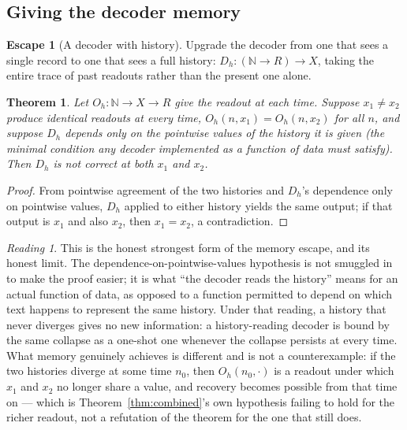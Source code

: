 \documentclass[10pt,twocolumn]{article}
\theoremstyle{plain}
\newtheorem{theorem}{Theorem}
\theoremstyle{definition}
\newtheorem{escape}{Escape}
\theoremstyle{remark}
\newtheorem*{reading}{Reading}
\begin{document}
\subsection{Giving the decoder memory}

\begin{escape}[A decoder with history]
Upgrade the decoder from one that sees a single record to one that sees a full history: $D_h : (\mathbb{N} \to R) \to X$, taking the entire trace of past readouts rather than the present one alone.
\end{escape}

\begin{theorem}\label{thm:escape4}
Let $O_h : \mathbb{N} \to X \to R$ give the readout at each time. Suppose $x_1 \neq x_2$ produce identical readouts at every time, $O_h(n,x_1) = O_h(n,x_2)$ for all $n$, and suppose $D_h$ depends only on the pointwise values of the history it is given (the minimal condition any decoder implemented as a function of data must satisfy). Then $D_h$ is not correct at both $x_1$ and $x_2$.
\end{theorem}

\begin{proof}
From pointwise agreement of the two histories and $D_h$'s dependence only on pointwise values, $D_h$ applied to either history yields the same output; if that output is $x_1$ and also $x_2$, then $x_1 = x_2$, a contradiction.
\end{proof}

\begin{reading}
This is the honest strongest form of the memory escape, and its honest limit. The dependence-on-pointwise-values hypothesis is not smuggled in to make the proof easier; it is what ``the decoder reads the history'' means for an actual function of data, as opposed to a function permitted to depend on which text happens to represent the same history. Under that reading, a history that never diverges gives no new information: a history-reading decoder is bound by the same collapse as a one-shot one whenever the collapse persists at every time. What memory genuinely achieves is different and is not a counterexample: if the two histories diverge at some time $n_0$, then $O_h(n_0, \cdot)$ is a readout under which $x_1$ and $x_2$ no longer share a value, and recovery becomes possible from that time on --- which is Theorem~\ref{thm:combined}'s own hypothesis failing to hold for the richer readout, not a refutation of the theorem for the one that still does.
\end{reading}
\end{document}
